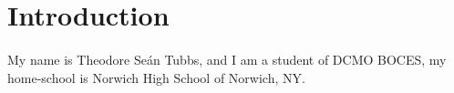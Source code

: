 \section{Introduction}
\paragraph{}
My name is Theodore Se\'{a}n Tubbs, and I am a student of DCMO BOCES, my
home-school is Norwich High School of Norwich, NY.

